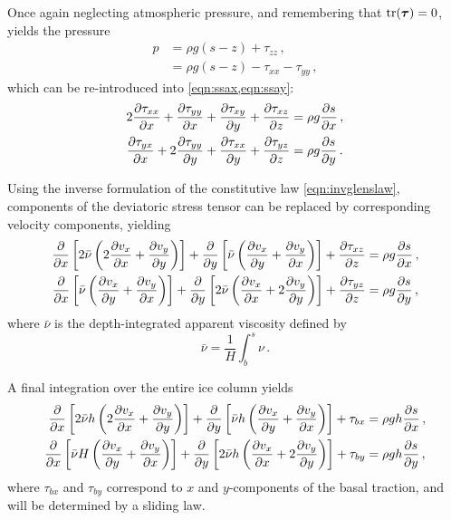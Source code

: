 \documentclass{article}
\newcommand{\tens}[1]{\vb*{#1}} %
\newcommand{\DST}[0]{\tens{\tau}}       %
\begin{document}
Once again neglecting atmospheric pressure, and remembering that $\tr(\DST)=0$,
 yields the pressure
\begin{align}
    p &= \rho g (s-z) + \tau_{zz} \,, \\
      &= \rho g (s-z) - \tau_{xx} - \tau_{yy} \,,
\end{align}
which can be re-introduced into \cref{eqn:ssax,eqn:ssay}:
\begin{subequations}
\begin{align}
    2\pdv{\tau_{xx}}{x} + \pdv{\tau_{yy}}{x} + \pdv{\tau_{xy}}{y}
        + \pdv{\tau_{xz}}{z} &= \rho g \pdv{s}{x} \,, \\
    \pdv{\tau_{yx}}{x} + 2\pdv{\tau_{yy}}{y} + \pdv{\tau_{xx}}{y}
        + \pdv{\tau_{yz}}{z} &= \rho g \pdv{s}{y} \,.
\end{align}
\end{subequations}

Using the inverse formulation of the constitutive law \eqref{eqn:invglenslaw},
components of the deviatoric stress tensor can be replaced by corresponding
velocity components, yielding
\begin{subequations}
\begin{align}
    \pdv{x} \left[2\bar{\nu}
                  \left(2\pdv{v_x}{x} + \pdv{v_y}{y}\right) \right]
        + \pdv{y} \left[\bar{\nu}
                        \left(\pdv{v_x}{y} + \pdv{v_y}{x}\right) \right]
        + \pdv{\tau_{xz}}{z} &= \rho g \pdv{s}{x} \,, \\
    \pdv{x} \left[\bar{\nu}
                  \left(\pdv{v_x}{y} + \pdv{v_y}{x}\right) \right]
        + \pdv{y} \left[2\bar{\nu}
                        \left(\pdv{v_x}{x} + 2\pdv{v_y}{y}\right) \right]
         + \pdv{\tau_{yz}}{z} &= \rho g \pdv{s}{y} \,,
\end{align}
\end{subequations}
where $\bar{\nu}$ is the depth-integrated apparent viscosity defined by
\begin{equation}
    \bar{\nu} = \frac{1}{H}\int_b^s\nu \,.
\end{equation}

A final integration over the entire ice column yields
\citep[Eqs.~7.7--7.8]{Weis.etal.1999}
\begin{subequations}
\begin{align}
    \label{eqn:vssa}
    \pdv{x} \left[2\bar{\nu}h
                  \left(2\pdv{v_x}{x} + \pdv{v_y}{y}\right) \right]
        + \pdv{y} \left[\bar{\nu}h
                        \left(\pdv{v_x}{y} + \pdv{v_y}{x}\right) \right]
        + \tau_{bx} &= \rho gh \pdv{s}{x} \,, \\
    \pdv{x} \left[\bar{\nu}H
                  \left(\pdv{v_x}{y} + \pdv{v_y}{x}\right) \right]
        + \pdv{y} \left[2\bar{\nu}h
                        \left(\pdv{v_x}{x} + 2\pdv{v_y}{y}\right) \right]
        + \tau_{by} &= \rho gh \pdv{s}{y} \,,
\end{align}
\end{subequations}
where $\tau_{bx}$ and $\tau_{by}$ correspond to $x$ and $y$-components of the
basal traction, and will be determined by a sliding law.
\end{document}
